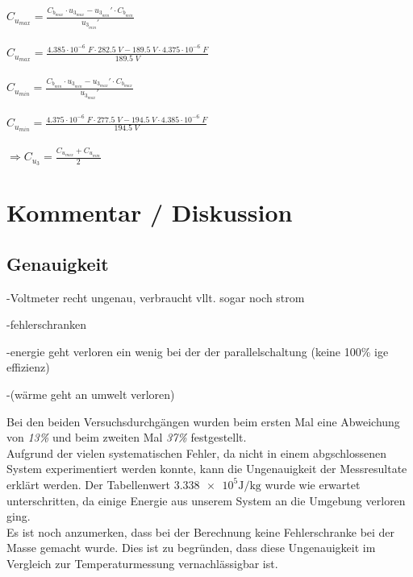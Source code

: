 \documentclass[a4paper,12pt]{article}
\begin{document}
$C_{u_{max}} = \displaystyle{\frac{C_{b_{max}}\cdot u_{3_{max}}-u_{3_{min}}'\cdot C_{b_{min}}}{u_{3_{min}}'}}$\\\\

$C_{u_{max}} = \displaystyle{\frac{4.385\cdot 10^{-6}\;F\cdot 282.5\;V-189.5\;V\cdot 4.375\cdot 10^{-6}\;F}{189.5\;V}}$\\\\

$C_{u_{min}} = \displaystyle{\frac{C_{b_{min}}\cdot u_{3_{min}}-u_{3_{max}}'\cdot C_{b_{max}}}{u_{3_{max}}'}}$\\\\

$C_{u_{min}} = \displaystyle{\frac{4.375\cdot 10^{-6}\;F\cdot 277.5\;V-194.5\;V\cdot 4.385\cdot 10^{-6}\;F}{194.5\;V}}$\\\\

$\Rightarrow C_{u_3}=\displaystyle{\frac{C_{u_{max}}+C_{u_{min}}}{2}}$

\section{Kommentar / Diskussion}

\subsection{Genauigkeit}
-Voltmeter recht ungenau, verbraucht vllt. sogar noch strom

-fehlerschranken

-energie geht verloren ein wenig bei der der parallelschaltung (keine 100\% ige effizienz)

-(wärme geht an umwelt verloren)

Bei den beiden Versuchsdurchgängen wurden beim ersten Mal eine Abweichung von \textit{13\%} und beim zweiten Mal \textit{37\%} festgestellt.\\

Aufgrund der vielen systematischen Fehler, da nicht in einem abgschlossenen System experimentiert werden konnte, kann die Ungenauigkeit der Messresultate erklärt werden. Der Tabellenwert $\num{3.338 e5}\si{\J\per\kg}$ \cite{formelsammlung} wurde wie erwartet unterschritten, da einige Energie aus unserem System an die Umgebung verloren ging.\\

Es ist noch anzumerken, dass bei der Berechnung keine Fehlerschranke bei der Masse gemacht wurde. Dies ist zu begründen, dass diese Ungenauigkeit im Vergleich zur Temperaturmessung vernachlässigbar ist.
\end{document}
